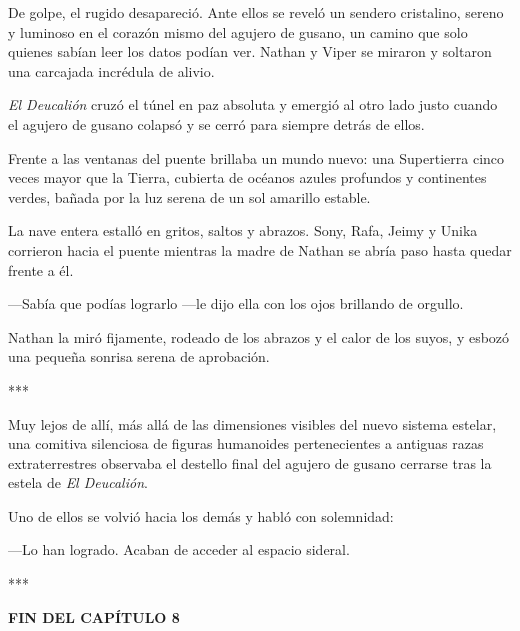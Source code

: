 \documentclass[12pt,a4paper]{book}
\begin{document}
De golpe, el rugido desapareció. Ante ellos se reveló un sendero cristalino, sereno y luminoso en el corazón mismo del agujero de gusano, un camino que solo quienes sabían leer los datos podían ver. Nathan y Viper se miraron y soltaron una carcajada incrédula de alivio.

\textit{El Deucalión} cruzó el túnel en paz absoluta y emergió al otro lado justo cuando el agujero de gusano colapsó y se cerró para siempre detrás de ellos.

Frente a las ventanas del puente brillaba un mundo nuevo: una Supertierra cinco veces mayor que la Tierra, cubierta de océanos azules profundos y continentes verdes, bañada por la luz serena de un sol amarillo estable.

La nave entera estalló en gritos, saltos y abrazos. Sony, Rafa, Jeimy y Unika corrieron hacia el puente mientras la madre de Nathan se abría paso hasta quedar frente a él.

---Sabía que podías lograrlo ---le dijo ella con los ojos brillando de orgullo.

Nathan la miró fijamente, rodeado de los abrazos y el calor de los suyos, y esbozó una pequeña sonrisa serena de aprobación.

***

Muy lejos de allí, más allá de las dimensiones visibles del nuevo sistema estelar, una comitiva silenciosa de figuras humanoides pertenecientes a antiguas razas extraterrestres observaba el destello final del agujero de gusano cerrarse tras la estela de \textit{El Deucalión}.

Uno de ellos se volvió hacia los demás y habló con solemnidad:

---Lo han logrado. Acaban de acceder al espacio sideral.

***

\textbf{FIN DEL CAPÍTULO 8}
\end{document}
